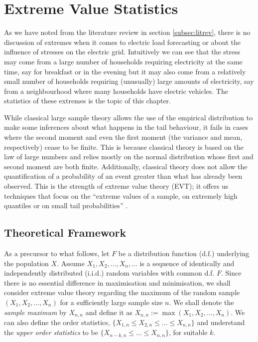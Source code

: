 
\chapter{Extreme Value Statistics} \label{sec:EVT}

As we have noted from the literature review in section \ref{subsec:litrev}, there is no discussion of extremes when it comes to electric load forecasting or about the influence of stresses on the electric grid. Intuitively we can see that the stress may come from a large number of households requiring electricity at the same time, say for breakfast or in the evening but it may also come from a relatively small number of households requiring (unusually) large amounts of electricity, say from a neighbourhood where many households have electric vehicles. The statistics of these extremes is the topic of this chapter.

While classical large sample theory allows the use of the empirical distribution to make some inferences about what happens in the tail behaviour, it fails in cases where the second moment and even the first moment (the variance and mean, respectively) cease to be finite. This is because classical theory is based on the law of large numbers and relies mostly on the normal distribution whose first and second moment are both finite. Additionally, classical theory does not allow the quantification of a probability of an event greater than what has already been observed. This is the strength of extreme value theory (EVT); it offers us techniques that focus on the ``extreme values of a sample, on extremely high quantiles or on small tail probabilities'' \cite[ch.~1]{beirlant}.

\section{Theoretical Framework} \label{subsec:EVT}

As a precursor to what follows, let $F$ be a distribution function (d.f.) underlying the population $X$. Assume $X_1,X_2, \ldots, X_n, \ldots$ is a sequence of identically and independently distributed (i.i.d.) random variables with common d.f. $F$. Since there is no essential difference in maximisation and minimisation, we shall consider extreme value theory regarding the maximum of the random sample $(X_1,X_2, \ldots, X_n)$ for a sufficiently large sample size $n$. We shall denote the \textit{sample maximum} by $X_{n,n}$ and define it as $X_{n,n}:= \max(X_1,X_2, \ldots, X_n)$. We can also define the order statistics, $\{X_{1,n} \le X_{2,n} \le ... \le X_{n,n}\}$ and understand the \textit{upper order statistics} to  be $\{X_{n-k,n} \le ... \le X_{n,n}\}$, for suitable $k$.%


